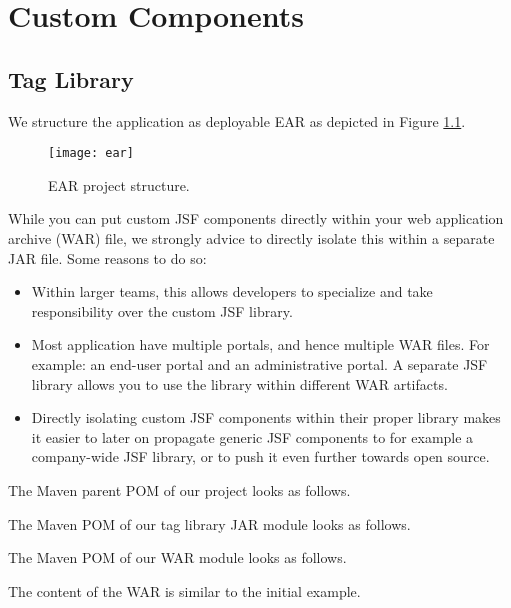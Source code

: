 %

\chapter{Custom Components}

\section{Tag Library}

We structure the application as deployable EAR as depicted in Figure \ref{fig:ear}.
\begin{figure}[htbp]
	\begin{center}
		\texttt{[image: ear]}
		\caption{EAR project structure.}
		\label{fig:ear}
	\end{center}
\end{figure}
While you can put custom JSF components directly within your web application archive (WAR) file,
we strongly advice to directly isolate this within a separate JAR file.
Some reasons to do so:
\begin{itemize}
	\item Within larger teams, this allows developers to specialize and take responsibility over the custom JSF library.
	\item Most application have multiple portals, and hence multiple WAR files. For example: an end-user portal and an administrative portal. A separate JSF library allows you to use the library within different WAR artifacts.
	\item Directly isolating custom JSF components within their proper library makes it easier to later on propagate generic JSF components to for example a company-wide JSF library, or to push it even further towards open source.
\end{itemize}
The Maven parent POM of our project looks as follows.


The Maven POM of our tag library JAR module looks as follows.


The Maven POM of our WAR module looks as follows.


The content of the WAR is similar to the initial example.

